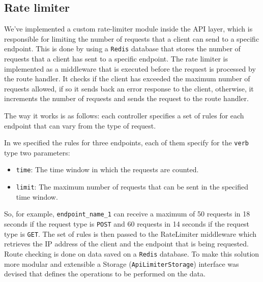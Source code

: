 \documentclass{scrartcl}
\begin{document}
\subsection{Rate limiter}
We've implemented a custom rate-limiter module inside the API layer, which is responsible for limiting the number of requests that a client can send to a specific endpoint. This is done by using a \texttt{Redis} database that stores the number of requests that a client has sent to a specific endpoint. The rate limiter is implemented as a middleware that is executed before the request is processed by the route handler. It checks if the client has exceeded the maximum number of requests allowed, if so it sends back an error response to the client, otherwise, it increments the number of requests and sends the request to the route handler.

The way it works is as follows: each controller specifies a set of rules for each endpoint that can vary from the type of request.


In  we specified the rules for three endpoints, each of them specify for the \texttt{verb} type two parameters:
\begin{itemize}
    \item \texttt{time}: The time window in which the requests are counted.
    \item \texttt{limit}: The maximum number of requests that can be sent in the specified time window.
\end{itemize}

So, for example, \texttt{endpoint\_name\_1} can receive a maximum of 50 requests in 18 seconds if the request type is \texttt{POST} and 60 requests in 14 seconds if the request type is \texttt{GET}.
The set of rules is then passed to the RateLimiter middleware which retrieves the IP address of the client and the endpoint that is being requested. 
Route checking is done on data saved on a \texttt{Redis} database. To make this solution more modular and extensible a Storage (\texttt{ApiLimiterStorage}) interface was devised that defines the operations to be performed on the data. 

\end{document}
